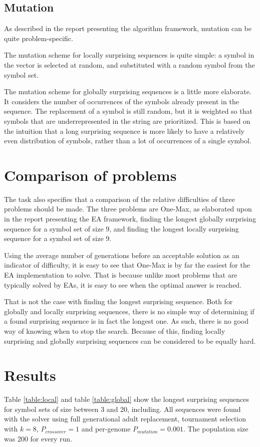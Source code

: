 \documentclass[twocolumn,oneside]{amsart}
\begin{document}
\subsection{Mutation}
As described in the report presenting the algorithm framework, mutation can be quite problem-specific.

The mutation scheme for locally surprising sequences is quite simple: a symbol in the vector is selected at random, and substituted with a random symbol from the symbol set.

The mutation scheme for globally surprising sequences is a little more elaborate.
It considers the number of occurrences of the symbols already present in the sequence.
The replacement of a symbol is still random, but it is weighted so that symbols that are underrepresented in the string are prioritized.
This is based on the intuition that a long surprising sequence is more likely to have a relatively even distribution of symbols, rather than a lot of occurrences of a single symbol.

\section{Comparison of problems}

The task also specifies that a comparison of the relative difficulties of three problems should be made.
The three problems are One-Max, as elaborated upon in the report presenting the EA framework, finding the longest globally surprising sequence for a symbol set of size 9, and finding the longest locally surprising sequence for a symbol set of size 9.

Using the average number of generations before an acceptable solution as an indicator of difficulty, it is easy to see that One-Max is by far the easiest for the EA implementation to solve.
That is because unlike most problems that are typically solved by EAs, it is easy to see when the optimal answer is reached.

That is not the case with finding the longest surprising sequence.
Both for globally and locally surprising sequences, there is no simple way of determining if a found surprising sequence is in fact the longest one.
As such, there is no good way of knowing when to stop the search.
Because of this, finding locally surprising and globally surprising sequences can be considered to be equally hard.

\section{Results}

Table \ref{table:local} and table \ref{table:global} show the longest surprising sequences for symbol sets of size between 3 and 20, including.
All sequences were found with the solver using full generational adult replacement, tournament selection with $ k = 8 $, $ P_{crossover} = 1 $ and per-genome $ P_{mutation} = 0.001 $.
The population size was 200 for every run.

\onecolumn

\restoregeometry
\end{document}
